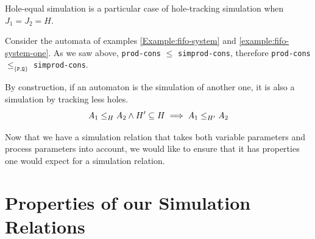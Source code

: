 \documentclass[runningheads]{llncs}
\newcommand{\xrightarrowdbl}[2][]{%
  \xrightarrow[#1]{#2}\mathrel{\mkern-14mu}\rightarrow
}
\begin{document}
\begin{property}\label{lem-sim-sim}
Hole-equal simulation is a particular case of hole-tracking simulation when  $J_1=J_2=H$.
\end{property}
\begin{example} Consider the automata of examples \ref{Example:fifo-system} and \ref{example:fifo-system-one}. As we saw above, \texttt{prod-cons} $\leq$ \texttt{simprod-cons}, therefore \texttt{prod-cons} $\leq_{\{\texttt{P,Q}\}}$ \texttt{simprod-cons}.
\end{example}



%
%

\begin{property} By construction, if an automaton is the simulation of another one, it is also a simulation by tracking less holes.
\[\wrel{A_1}{A_2}{H} \land H'\subseteq H \implies \wrel{A_1}{A_2}{H'}\]
\end{property}

Now that we have a simulation relation that takes both variable parameters and process parameters into account, we would like to ensure that it has  properties one would expect for a simulation relation.

\section{Properties of our Simulation Relations}\label{sec:prop}
\end{document}

